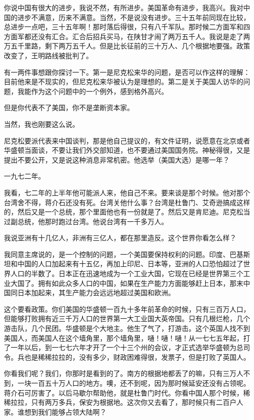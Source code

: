 你说中国有很大的进步，我说不然，有所进步。美国革命有进步，我高兴。我对中国的进步不满意，历来不满意。当然，不是说没有进步。三十五年前同现在比较，总进步一点吧，三十五年啊！那时落后得很，只有八千军队。那时候二方面军和四方面军都还没有汇合。汇合后招兵买马，在陕甘才闹了两万五千人。我说是走了两万五千里路，剩下两万五千人。但是比长征前的三十万人、几个根据地要强。政策改变了，王明路线被批判了。

有一两件事想跟你探讨一下。第一是尼克松来华的问题，是否可以作这样的理解：目前他来是不现实的，但尼克松来华被认为是理想的。第二是关于美国人访华的问题，我能作为这个问题中的一个例外，感到格外高兴。

但是你代表不了美国，你不是垄断资本家。

当然，我也刚要这么说。

尼克松要派代表来中国谈判，那是他自己提议的，有文件证明，说愿意在北京或者华盛顿当面谈，不要让我们外交部知道，也不要通过美国国务院。神秘得很，又是提出不要公开，又是说这种消息非常机密。他选举（美国大选）是哪一年？

一九七二年。

我看，七二年的上半年他可能派人来，他自己不来。要来谈是那个时候。他对那个台湾舍不得，蒋介石还没有死。台湾关他什么事？台湾是杜鲁门、艾奇逊搞成这样的，然后又是一个总统，那个里面他也有一份就是了。然后又是肯尼迪。尼克松当过副总统，他那时跑过台湾。他说台湾有一千多万人。

我说亚洲有十几亿人，非洲有三亿人，都在那里造反。这个世界你看怎么样？

我同意主席说的，是一个控制的问题，一个美国要保持权利的问题。印度、巴基斯坦和中国的人口加起来有十五亿，再加上印尼、日本等，亚洲的人口恐怕超过了世界人口的半数了。日本正在迅速地成为一个工业大国，它现在已经是世界第三个工业大国了。拥有如此众多人口的中国，如果在生产能力方面能够赶上日本，那末中国同日本加起来，其生产能力会远远地超过美国和欧洲。

这个要看政策。你们美国的华盛顿一百九十多年前革命的时候，只有三百万人口，但能够打败拥有近三千万人口的世界第一大工业国大英帝国。只有几根烂枪，几个游击队，几个民团。华盛顿是个大地主。他生了气了，打游击。这个英国人找不到美国人，而美国人在这个墙角里，那个墙角里，嗵！嗵！嗵！从一七七五年起，打了一年以后，到一七七六年才开了一个十三个州的会议，才正式选举华盛顿为总司令。兵也是稀稀拉拉的，没有多少，财政困难得很，发票子，但是打败了英国人。

你看我们呢？我们，你那时是看到的了。南方的根据地都丢了的嘛，只有三万人不到，一块一百五十万人口的地方。噢，还不到呢，因为那时候延安还没有占领呢。蒋介石可厉害了。以后马歇尔帮助他，就是杜鲁门时代。你看中国人那个时候，稀稀拉拉，只有两万多兵，保安为根据地。这次你又去看了，那时候只有二百户人家。谁想到我们能够占领大陆啊？

